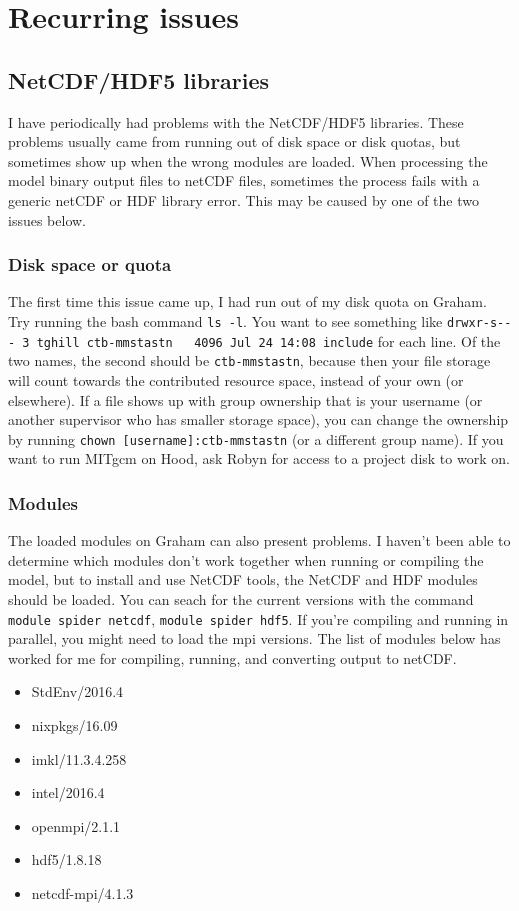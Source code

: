 \documentclass[11pt]{article}
\begin{document}
\section{Recurring issues}

\subsection{NetCDF/HDF5 libraries}
I have periodically had problems with the NetCDF/HDF5 libraries. These problems usually came from running out of disk space or disk quotas, but sometimes show up when the wrong modules are loaded. When processing the model binary output files to netCDF files, sometimes the process fails with a generic netCDF or HDF library error. This may be caused by one of the two issues below.

\subsubsection{Disk space or quota}
The first time this issue came up, I had run out of my disk quota on Graham. Try running the bash command \verb|ls -l|. You want to see something like \verb|drwxr-s--- 3 tghill ctb-mmstastn   4096 Jul 24 14:08 include| for each line. Of the two names, the second should be \verb|ctb-mmstastn|, because then your file storage will count towards the contributed resource space, instead of your own (or elsewhere). If a file shows up with group ownership that is your username (or another supervisor who has smaller storage space), you can change the ownership by running \verb|chown [username]:ctb-mmstastn| (or a different group name). If you want to run MITgcm on Hood, ask Robyn for access to a project disk to work on.

\subsubsection{Modules}
The loaded modules on Graham can also present problems. I haven't been able to determine which modules don't work together when running or compiling the model, but to install and use NetCDF tools, the NetCDF and HDF modules should be loaded. You can seach for the current versions with  the command \verb|module spider netcdf|, \verb|module spider hdf5|. If you're compiling and running in parallel, you might need to load the mpi versions. The list of modules below has worked for me for compiling, running, and converting output to netCDF.

\begin{itemize}
\item{StdEnv/2016.4}
\item{nixpkgs/16.09}
\item{imkl/11.3.4.258}
\item{intel/2016.4}
\item{openmpi/2.1.1}
\item{hdf5/1.8.18}
\item{netcdf-mpi/4.1.3}
\end{itemize}
\end{document}
